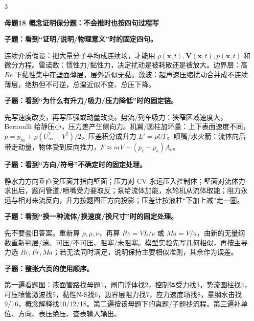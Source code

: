 \documentclass[a4paper]{article}
\newcommand{\mt}[1]{\vspace{0.22pt}\colorbox{M}{\parbox{\dimexpr\linewidth-2\fboxsep}{\color{white}\bfseries #1}}\par}
\newcommand{\qt}[1]{\vspace{0.10pt}\colorbox{Q}{\parbox{\dimexpr\linewidth-2\fboxsep}{\color{white}\bfseries #1}}\par}
\newcommand{\ans}[1]{\colorbox{G}{\parbox{\dimexpr\linewidth-2\fboxsep}{#1}}\par}
\begin{document}
\begin{multicols}{3}
\mt{母题18 概念证明保分题：不会推时也按四句过程写}
\qt{子题：看到“证明/说明/物理意义”时的固定四句。}
\ans{连续介质假设：把大量分子平均成连续场，才能用 $\rho(\bm x,t),\bm V(\bm x,t),p(\bm x,t)$ 和微分方程。雷诺数：惯性力/黏性力，决定扰动是被耗散还是被放大。边界层：高 $Re$ 下黏性集中在壁面薄层，层外近似无黏。激波：超声速压缩扰动合并成不连续薄层，绝热但不可逆，总温近似不变、总压下降。}
\qt{子题：看到“为什么有升力/吸力/压力降低”时的固定链。}
\ans{先写速度改变，再写压强或动量改变。势流/列车吸力：狭窄区域速度大，Bernoulli 给静压小，压力差产生侧向力。机翼/圆柱加环量：上下表面速度不同，$p=p_\infty+\rho(U_\infty^2-V^2)/2$，压差积分成升力 $L'=\rho U\Gamma$。喷嘴/水火箭：流体向后带走动量，物体受到反向推力，$F\approx\dot mV+(p_e-p_a)A_e$。}
\qt{子题：看到“方向/符号”不确定时的固定处理。}
\ans{静水力方向垂直受压面并指向壁面；压力对 CV 永远压入控制体；壁面对流体力求出后，题问管道/喷嘴受力要取反；泵给流体加能，水轮机从流体取能；阻力永远与相对来流反向，升力按题图正方向投影；压差计按液柱“下加上减”走一圈。}
\qt{子题：看到“换一种流体/换速度/换尺寸”时的固定处理。}
\ans{先不要套旧答案。重新算 $\rho,\mu,\nu$，再算 $Re=VL/\nu$ 或 $Ma=V/a$，由新的无量纲数重新判层/湍、可压/不可压、阻塞/未阻塞。模型实验先写几何相似，再按主导力选 $Re,Fr,Ma$；若无法同时满足，说明保持主要相似准则，其余作为误差。}
\qt{子题：整张六页的使用顺序。}
\ans{第一遍看题图：液面管路找母题1，闸门浮体找2，控制体受力找3，势流圆柱找4，可压喷管激波找5，黏性N-S找6，边界层阻力找7，应力速度场找8，量纲水击找9/16，概念解释找10/12/18。第二遍按该母题下的真题/子题抄流程。第三遍补单位、方向、表压绝压、查表输入输出。}


\end{multicols}
\end{document}
